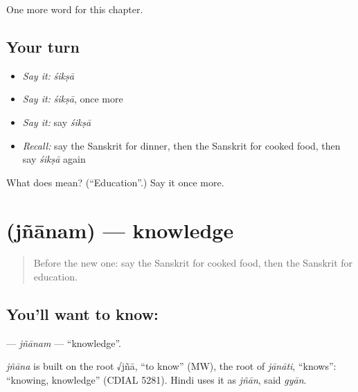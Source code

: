 \begin{grammarlens}[title={What you've built}]
One more word for this chapter.
\end{grammarlens}

\subsection*{Your turn}
\begin{itemize}
\raggedright
  \item \emph{Say it:} \emph{śikṣā}
  \item \emph{Say it:} \emph{śikṣā}, once more
  \item \emph{Say it:} say \emph{śikṣā}
  \item \emph{Recall:} say the Sanskrit for dinner, then the Sanskrit for cooked food, then say \emph{śikṣā} again
\end{itemize}

\begin{tcolorbox}[breakable,colback=teal!4,colframe=teal!35!black,title={Before you move on}]
What does  mean? (\textquotedblleft{}Education\textquotedblright{}.) Say it once more.
\end{tcolorbox}
\section[\texorpdfstring{\sk{ज्ञानम्} (jñānam)}{ज्ञानम् (jñānam)}]{ (jñānam) — knowledge}

\label{lesson:SA-C255-jnanam}



\begin{quote}
Before the new one: say the Sanskrit for cooked food, then the Sanskrit for education.
\end{quote}

\subsection*{You'll want to know: }
\textbf{} — \emph{jñānam} — \textquotedblleft{}knowledge\textquotedblright{}.

\begin{cousinweb}
\emph{jñāna} is built on the root √jñā, \textquotedblleft{}to know\textquotedblright{} (MW), the root of \emph{jānāti}, \textquotedblleft{}knows\textquotedblright{}: \textquotedblleft{}knowing, knowledge\textquotedblright{} (CDIAL 5281). Hindi uses it as \emph{jñān}, said \emph{gyān}.
\end{cousinweb}

